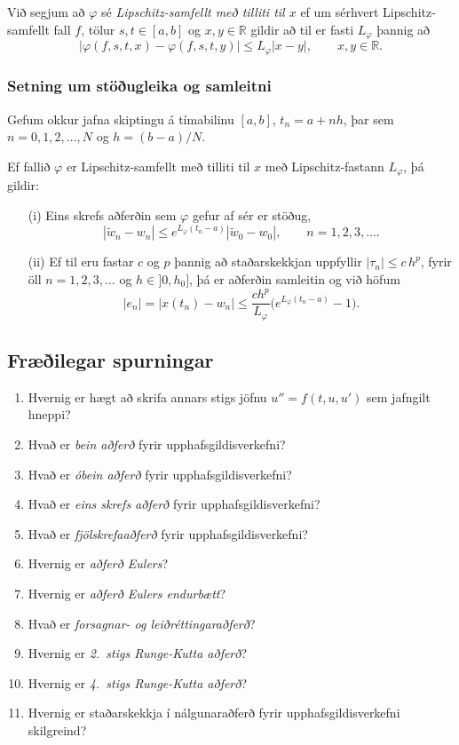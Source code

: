 \documentclass[icelandic,a4paper,12pt]{article}
\newcommand{\R}{{\mathbb  R}}
\begin{document}
\pause
\smallskip
Við segjum að $\varphi$ sé {\it Lipschitz-samfellt með
tilliti til $x$} ef um sérhvert Lipschitz-samfellt fall $f$, tölur
$s,t\in [a,b]$ og $x,y\in \R$ gildir að til er fasti $L_\varphi$
þannig að
$$
|\varphi(f,s,t,x)-\varphi(f,s,t,y)|\leq L_\varphi|x-y|, \qquad x,y\in \R.
$$ 



\subsubsection{Setning um stöðugleika og samleitni} 
Gefum okkur jafna skiptingu á tímabilinu $[a,b]$,
$t_n=a+nh$, þar sem $n=0,1,2,\dots,N$ og $h=(b-a)/N$.

\pause
\smallskip
Ef fallið $\varphi$ er Lipschitz-samfellt með tilliti til $x$ 
með Lipschitz-fastann
$L_\varphi$, þá gildir:
  \begin{enumerate}
  \item[(i)] Eins skrefs aðferðin sem $\varphi$ gefur af sér
er stöðug,
$$
|\tilde w_n-w_n|\leq e^{L_\varphi(t_n-a)}|\tilde w_0-w_0|, \qquad
n=1,2,3,\dots. 
$$
  \item[(ii)] Ef til eru fastar $c$ og $p$ þannig að staðarskekkjan
    uppfyllir $|\tau_n|\leq c\, h^p$, fyrir öll $n=1,2,3,\dots$ og
    $h\in ]0,h_0]$, þá er aðferðin samleitin og við höfum
$$
|e_n|=|x(t_n)-w_n|\leq \dfrac{ch^p}{L_\varphi}
\bigg(e^{L_\varphi(t_n-a)}-1\bigg).
$$ 
  \end{enumerate}



\subsection{Fræðilegar spurningar}
  \begin{enumerate}
  \item Hvernig er hægt að skrifa annars stigs jöfnu
$u''=f(t,u,u')$ sem jafngilt hneppi?
  \item Hvað er {\it bein aðferð} fyrir upphafsgildisverkefni? 
  \item Hvað er {\it óbein aðferð} fyrir upphafsgildisverkefni? 
  \item Hvað er {\it eins skrefs aðferð} fyrir upphafsgildisverkefni? 
  \item Hvað er {\it fjölskrefaaðferð} fyrir upphafsgildisverkefni? 
  \item Hvernig er {\it aðferð Eulers}? 
  \item Hvernig er {\it aðferð Eulers endurbætt}?
  \item Hvað er {\it forsagnar- og leiðréttingaraðferð}?
  \item Hvernig er {\it 2.~stigs Runge-Kutta aðferð}?
  \item Hvernig er {\it 4.~stigs Runge-Kutta aðferð}?
  \item Hvernig er staðarskekkja í nálgunaraðferð fyrir
    upphafsgildisverkefni skilgreind?
  \end{enumerate}
\end{document}
